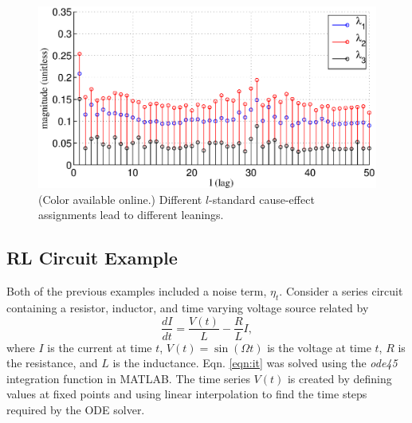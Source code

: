 \documentclass[a4paper,11pt,twocolumn]{article}
\begin{document}
\begin{figure}[ht]
\includegraphics[scale=0.45]{NonlinearCyclicexample_difflags.eps}
\caption{(Color available online.) Different $l$-standard cause-effect assignments lead to different leanings.}
\end{figure}  

\subsection{RL Circuit Example}
\label{sec:rlcirc}
Both of the previous examples included a noise term, $\eta_t$.  Consider a series circuit containing a resistor, inductor, and time varying voltage source related by
\begin{equation}
\label{eqn:it}
\frac{dI}{dt} = \frac{V(t)}{L} - \frac{R}{L} I,
\end{equation}
where $I$ is the current at time $t$, $V(t)= \sin\left(\Omega t\right)$ is the voltage at time $t$, $R$ is the resistance, and $L$ is the inductance.  Eqn. \ref{eqn:it} was solved using the {\em ode45} integration function in MATLAB.  The time series $V(t)$ is created by defining values at fixed points and using linear interpolation to find the time steps required by the ODE solver.  
\end{document}
